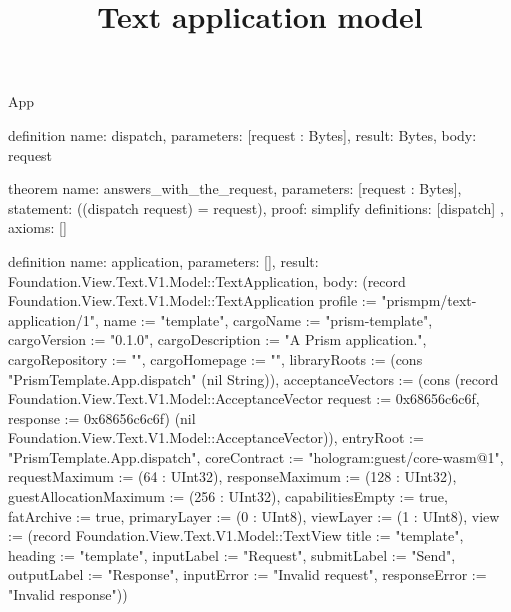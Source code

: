 \begin{lexlean}{App}
\title{Text application model}
\begin{semanticmodule}
definition{
  name: dispatch,
  parameters: [request : Bytes],
  result: Bytes,
  body: request
}

theorem{
  name: answers_with_the_request,
  parameters: [request : Bytes],
  statement: ((dispatch request) = request),
  proof: simplify{
    definitions: [dispatch]
  },
  axioms: []
}

definition{
  name: application,
  parameters: [],
  result: Foundation.View.Text.V1.Model::TextApplication,
  body: (record Foundation.View.Text.V1.Model::TextApplication {profile := "prismpm/text-application/1", name := "template", cargoName := "prism-template", cargoVersion := "0.1.0", cargoDescription := "A Prism application.", cargoRepository := "", cargoHomepage := "", libraryRoots := (cons "PrismTemplate.App.dispatch" (nil String)), acceptanceVectors := (cons (record Foundation.View.Text.V1.Model::AcceptanceVector {request := 0x68656c6c6f, response := 0x68656c6c6f}) (nil Foundation.View.Text.V1.Model::AcceptanceVector)), entryRoot := "PrismTemplate.App.dispatch", coreContract := "hologram:guest/core-wasm@1", requestMaximum := (64 : UInt32), responseMaximum := (128 : UInt32), guestAllocationMaximum := (256 : UInt32), capabilitiesEmpty := true, fatArchive := true, primaryLayer := (0 : UInt8), viewLayer := (1 : UInt8), view := (record Foundation.View.Text.V1.Model::TextView {title := "template", heading := "template", inputLabel := "Request", submitLabel := "Send", outputLabel := "Response", inputError := "Invalid request", responseError := "Invalid response"})})
}
\end{semanticmodule}
\end{lexlean}
